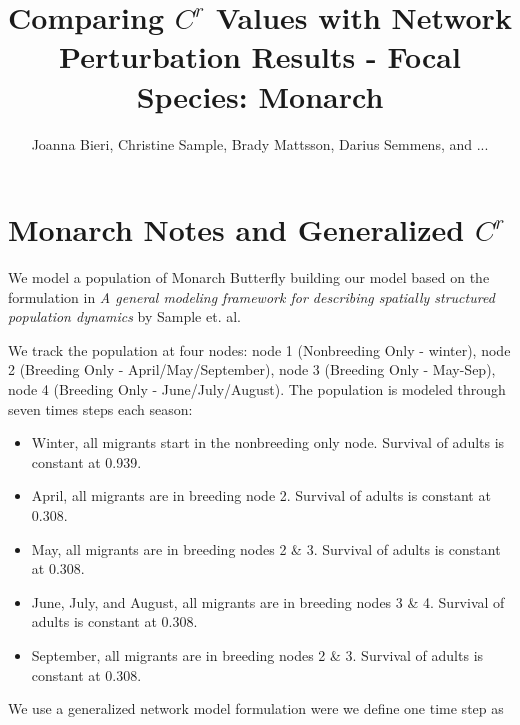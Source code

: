 \documentclass[10pt]{article}
\title{Comparing $C^r$ Values with Network Perturbation Results - Focal Species: Monarch}
\date{}
\author{Joanna Bieri, Christine Sample, Brady Mattsson, Darius Semmens, and ...}
\begin{document}


\newcommand{\multilineR}[1]{\begin{tabular}[b]{@{}r@{}}#1\end{tabular}}
\newcommand{\multilineL}[1]{\begin{tabular}[b]{@{}l@{}}#1\end{tabular}}
\newcommand{\multilineC}[1]{\begin{tabular}[b]{@{}c@{}}#1\end{tabular}}

\thispagestyle{empty}

\maketitle

\tableofcontents


\section{Monarch Notes and Generalized \texorpdfstring{$C^r$}{CR} }
We model a population of Monarch Butterfly building our model based on the formulation in  {\it{A general modeling framework for describing spatially structured population dynamics}} by Sample et. al.

We track the population at four nodes: node 1 (Nonbreeding Only - winter), node 2 (Breeding Only - April/May/September), node 3 (Breeding Only - May-Sep), node 4 (Breeding Only - June/July/August). The population is modeled through seven times steps each season:
\begin{itemize}
\item Winter, all migrants start in the nonbreeding only node. Survival of adults is constant at 0.939. 
\item April, all migrants are in breeding node 2. Survival of adults is constant at 0.308.
\item May, all migrants are in breeding nodes 2 \& 3. Survival of adults is constant at 0.308.
\item June, July, and August, all migrants are in breeding nodes 3 \& 4. Survival of adults is constant at 0.308.
\item September, all migrants are in breeding nodes 2 \& 3. Survival of adults is constant at 0.308.
\end{itemize}

We use a generalized network model formulation were we define one time step as
\end{document}
